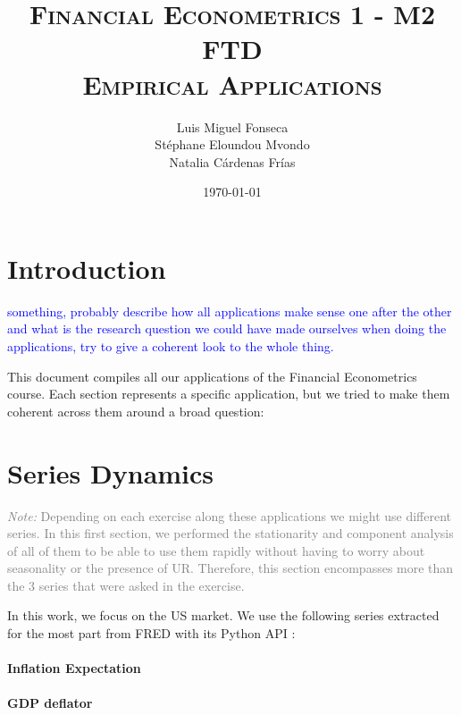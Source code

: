 \documentclass[hidelinks,12pts]{article}
\DeclareMathOperator{\1}{\mathbbm{1}}
\begin{document}
        \title{\scshape{Financial Econometrics 1 - M2 FTD \\ Empirical Applications}}
        \author{Luis Miguel Fonseca \\ Stéphane Eloundou Mvondo\\ Natalia Cárdenas Frías }
        \date{\today}
        \maketitle 

\tableofcontents
\newpage


\section*{Introduction} 
\textcolor{blue}{something, probably describe how all applications make sense one after the other and what is the research question we could have made ourselves when doing the applications, try to give a coherent look to the whole thing.}

This document compiles all our applications of the Financial Econometrics course. 
Each section represents a specific application, but we tried to make them coherent across them around a broad question: 





\section{Series Dynamics}\label{sec:dynamics}

\textcolor{gray}{\emph{Note:} Depending on each exercise along these applications we might use different series. In this first section, we performed the stationarity and component analysis of all of them to be able to use them rapidly without having to worry about seasonality or the presence of UR. Therefore, this section encompasses more than the 3 series that were asked in the exercise.}


In this work, we focus on the US market.
We use the following series extracted for the most part from FRED with its Python API : 

\paragraph{Inflation Expectation}

\paragraph{GDP deflator}
\end{document}
